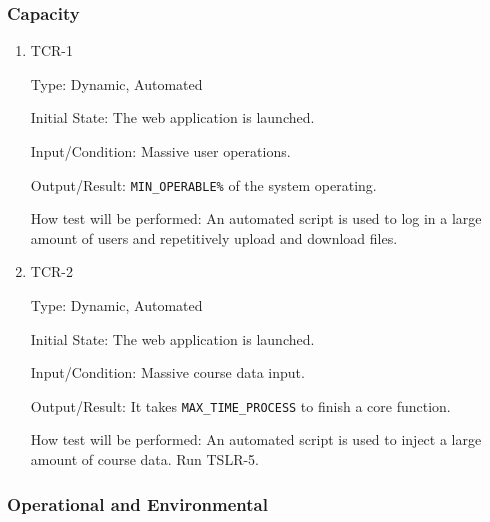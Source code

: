 \documentclass[12pt, titlepage]{article}
\begin{document}
\subsubsection{Capacity}

\begin{enumerate}
\item{TCR-1\\}\label{TCR-1}

Type: Dynamic, Automated
					
Initial State: The web application is launched.
					
Input/Condition: Massive user operations.
					
Output/Result: \texttt{MIN\_OPERABLE\%} of the system operating.
					
How test will be performed: An automated script is used to log in a large amount of users and repetitively upload and download files.

\item{TCR-2\\}\label{TCR-2}

Type: Dynamic, Automated
					
Initial State: The web application is launched.
					
Input/Condition: Massive course data input.
					
Output/Result: It takes \texttt{MAX\_TIME\_PROCESS} to finish a core function.
					
How test will be performed: An automated script is used to inject a large amount of course data.  Run TSLR-5.

\end{enumerate}

\subsubsection{Operational  and Environmental}
\end{document}

